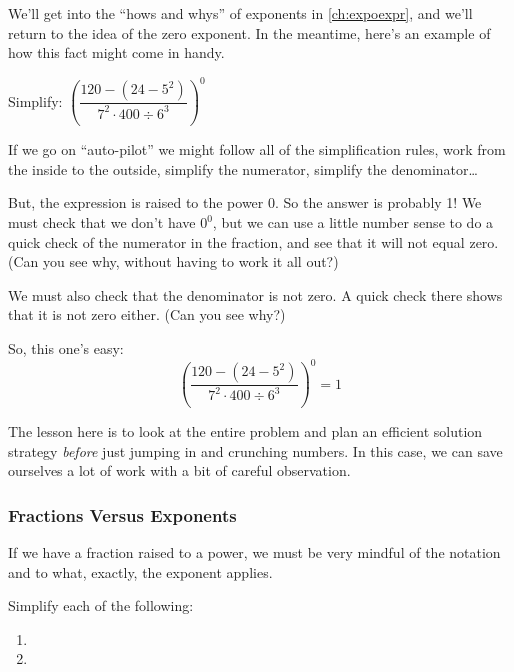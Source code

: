 We'll get into the ``hows and whys'' of exponents in \cref{ch:expoexpr}, and we'll return to the idea of the zero exponent. In the meantime, here's an example of how this fact might come in handy.

\begin{boxedex}
Simplify: $\left( \dfrac{120-(24-5^2)}{7^2 \cdot 400 \div 6^3} \right)^0$

\exsoln If we go on ``auto-pilot'' we might follow all of the simplification rules, work from the inside to the outside, simplify the numerator, simplify the denominator\ldots

But, the expression is raised to the power 0. So the answer is probably 1! We must check that we don't have $0^0$, but we can use a little number sense to do a quick check of the numerator in the fraction, and see that it will not equal zero. (Can you see why, without having to work it all out?)

We must also check that the denominator is not zero. A quick check there shows that it is not zero either. (Can you see why?)

So, this one's easy:
\[\left( \frac{120-(24-5^2)}{7^2 \cdot 400 \div 6^3} \right)^0 = 1\]

The lesson here is to look at the entire problem and plan an efficient solution strategy \textit{before} just jumping in and crunching numbers. In this case, we can save ourselves a lot of work with a bit of careful observation.
\end{boxedex}

\subsubsection*{Fractions Versus Exponents}

If we have a fraction raised to a power, we must be very mindful of the notation and to what, exactly, the exponent applies.

\begin{boxedex}
Simplify each of the following:

\begin{enumerate}[itemsep=10pt]
\item {}

\item {}
\end{enumerate}
\end{boxedex}

